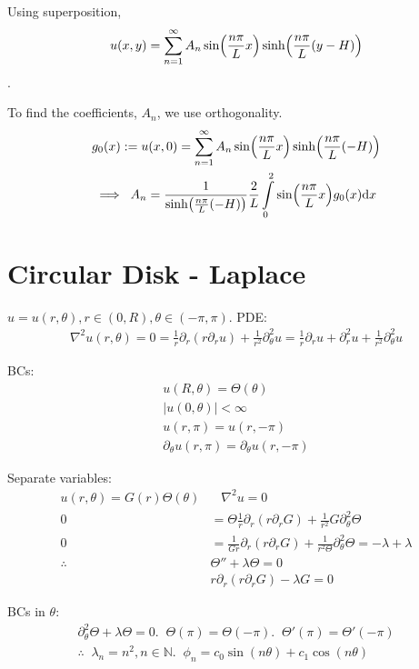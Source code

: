 Using superposition, 
\[ u(x, y) = \sum\limits_{n=1}^\infty A_n \sin(\frac{n\pi}{L} x) \sinh (\frac{n\pi}{L} (y-H)) \].

To find the coefficients, $A_n$, we use orthogonality. 
\begin{gather*}
	g_0(x) := u(x, 0) = \sum\limits_{n=1}^\infty A_n \sin (\frac{n\pi}{L} x) \sinh ( \frac{n\pi}{L} (-H) )  \\
	\implies \; A_n = \frac{1}{\sinh(\frac{n\pi}{L} (-H) )} \frac{2}{L} \int\limits_0^2 
		\sin(\frac{n\pi}{L} x) g_0(x) \text{d} x
\end{gather*} 


\section{Circular Disk - Laplace}
$u = u(r, \theta), r\in(0, R), \theta\in(-\pi, \pi)$.
PDE: 
\begin{align*}
\nabla^2 u (r, \theta) = 0 
	= \frac{1}{r} \partial_r (r \partial_r u) + \frac{1}{r^2} \partial_\theta^2 u 
	= \frac{1}{r} \partial_r u + \partial_r^2 u + \frac{1}{r^2} \partial_\theta^2 u	 
\end{align*}

BCs: 
\begin{gather*}
	u(R, \theta) = \Theta(\theta) \tag{Outer edge B.C.} \\
	|u(0, \theta)| < \infty \tag{finite at origin} \\
	u(r, \pi) = u(r, -\pi) \tag{periodic I} \\
	\partial_\theta u (r, \pi) = \partial_\theta u(r, -\pi) \tag{periodic II}
\end{gather*}

Separate variables:
\[\begin{aligned}
	u(r, \theta) = G(r) \Theta(\theta) &\;\;\; \nabla^2 u = 0 \\
	0	&= \Theta \frac{1}{r} \partial_r ( r \partial_r G) + \frac{1}{r^2} G \partial_\theta^2 \Theta \\
	0	&= \frac{1}{Gr} \partial_r ( r \partial_r G) + \frac{1}{r^2 \Theta} \partial_\theta^2 \Theta = -\lambda + \lambda \\
	\therefore \; & \boxed{ \Theta'' + \lambda \Theta = 0 } \\
	& \boxed{ r\partial_r ( r\partial_r G) - \lambda G = 0 }
\end{aligned}\]

BCs in $\theta$:
\begin{gather*}
	\partial_\theta^2 \Theta + \lambda \Theta = 0. \;\; \Theta(\pi) = \Theta(-\pi). \;\; \Theta'(\pi) = \Theta'(-\pi) \\
	\therefore \;\; \boxed{\lambda_n = n^2, n\in \mathbb{N}. \;\; \phi_n = c_0 \sin(n\theta) + c_1 \cos (n \theta) } 
\end{gather*}

